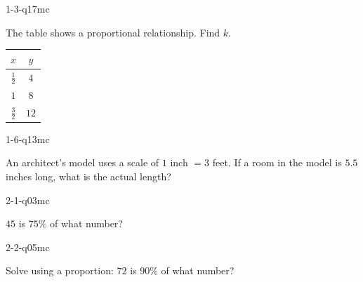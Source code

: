 
\begin{practiceQuestion}{1-3-q17}{mc}
\begin{questionText}
The table shows a proportional relationship. Find $k$.

\begin{center}
\begin{tabular}{|c|c|}
\hline $x$ & $y$ \\ \hline $\frac{1}{2}$ & $4$ \\ $1$ & $8$ \\ $\frac{3}{2}$ & $12$ \\ \hline
\end{tabular}
\end{center}
\end{questionText}
\end{practiceQuestion}

\begin{practiceQuestion}{1-6-q13}{mc}
\begin{questionText}
An architect's model uses a scale of $1$ inch $= 3$ feet. If a room in the model is $5.5$ inches long, what is the actual length?
\end{questionText}
\end{practiceQuestion}

\begin{practiceQuestion}{2-1-q03}{mc}
\begin{questionText}
$45$ is $75\%$ of what number?
\end{questionText}
\end{practiceQuestion}

\begin{practiceQuestion}{2-2-q05}{mc}
\begin{questionText}
Solve using a proportion: $72$ is $90\%$ of what number?
\end{questionText}
\end{practiceQuestion}


